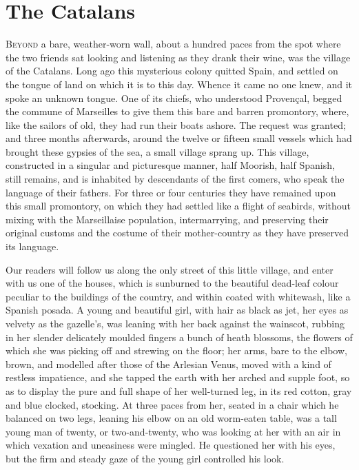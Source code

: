 \chapter{The Catalans} 

 \lettrine{B}{eyond} a bare, weather-worn wall, about a hundred paces from the spot where the two friends sat looking and listening as they drank their wine, was the village of the Catalans. Long ago this mysterious colony quitted Spain, and settled on the tongue of land on which it is to this day. Whence it came no one knew, and it spoke an unknown tongue. One of its chiefs, who understood Provençal, begged the commune of Marseilles to give them this bare and barren promontory, where, like the sailors of old, they had run their boats ashore. The request was granted; and three months afterwards, around the twelve or fifteen small vessels which had brought these gypsies of the sea, a small village sprang up. This village, constructed in a singular and picturesque manner, half Moorish, half Spanish, still remains, and is inhabited by descendants of the first comers, who speak the language of their fathers. For three or four centuries they have remained upon this small promontory, on which they had settled like a flight of seabirds, without mixing with the Marseillaise population, intermarrying, and preserving their original customs and the costume of their mother-country as they have preserved its language. 

 Our readers will follow us along the only street of this little village, and enter with us one of the houses, which is sunburned to the beautiful dead-leaf colour peculiar to the buildings of the country, and within coated with whitewash, like a Spanish posada. A young and beautiful girl, with hair as black as jet, her eyes as velvety as the gazelle's, was leaning with her back against the wainscot, rubbing in her slender delicately moulded fingers a bunch of heath blossoms, the flowers of which she was picking off and strewing on the floor; her arms, bare to the elbow, brown, and modelled after those of the Arlesian Venus, moved with a kind of restless impatience, and she tapped the earth with her arched and supple foot, so as to display the pure and full shape of her well-turned leg, in its red cotton, gray and blue clocked, stocking. At three paces from her, seated in a chair which he balanced on two legs, leaning his elbow on an old worm-eaten table, was a tall young man of twenty, or two-and-twenty, who was looking at her with an air in which vexation and uneasiness were mingled. He questioned her with his eyes, but the firm and steady gaze of the young girl controlled his look. 

